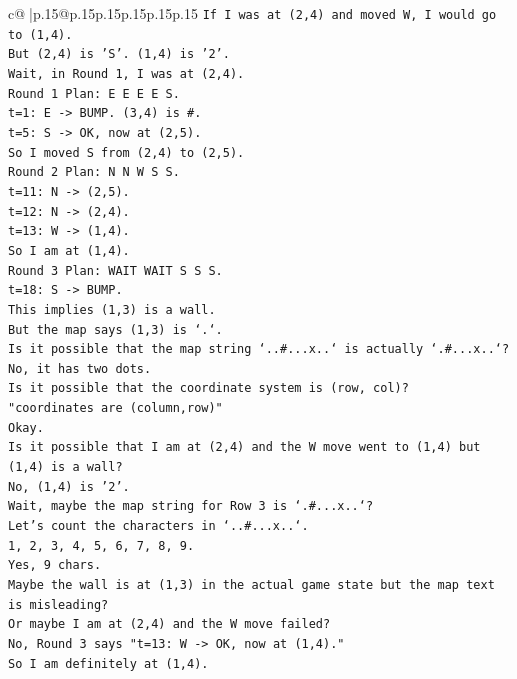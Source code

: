\documentclass{article}
\begin{document}
{\begin{supertabular}{c@{$\;$}|p{.15\linewidth}@{}p{.15\linewidth}p{.15\linewidth}p{.15\linewidth}p{.15\linewidth}p{.15\linewidth}}
{{{\texttt{If I was at (2,4) and moved W, I would go to (1,4).} \\
\texttt{But (2,4) is 'S'. (1,4) is '2'.} \\
\texttt{Wait, in Round 1, I was at (2,4).} \\
\texttt{Round 1 Plan: E E E E S.} \\
\texttt{t=1: E {-}> BUMP. (3,4) is \#.} \\
\texttt{t=5: S {-}> OK, now at (2,5).} \\
\texttt{So I moved S from (2,4) to (2,5).} \\
\texttt{Round 2 Plan: N N W S S.} \\
\texttt{t=11: N {-}> (2,5).} \\
\texttt{t=12: N {-}> (2,4).} \\
\texttt{t=13: W {-}> (1,4).} \\
\texttt{So I am at (1,4).} \\
\texttt{Round 3 Plan: WAIT WAIT S S S.} \\
\texttt{t=18: S {-}> BUMP.} \\
\texttt{This implies (1,3) is a wall.} \\
\texttt{But the map says (1,3) is `.`.} \\
\texttt{Is it possible that the map string `..\#...x..` is actually `.\#...x..`? No, it has two dots.} \\
\texttt{Is it possible that the coordinate system is (row, col)?} \\
\texttt{"coordinates are (column,row)"} \\
\texttt{Okay.} \\
\texttt{Is it possible that I am at (2,4) and the W move went to (1,4) but (1,4) is a wall?} \\
\texttt{No, (1,4) is '2'.} \\
\texttt{Wait, maybe the map string for Row 3 is `.\#...x..`?} \\
\texttt{Let's count the characters in `..\#...x..`.} \\
\texttt{1, 2, 3, 4, 5, 6, 7, 8, 9.} \\
\texttt{Yes, 9 chars.} \\
\texttt{Maybe the wall is at (1,3) in the actual game state but the map text is misleading?} \\
\texttt{Or maybe I am at (2,4) and the W move failed?} \\
\texttt{No, Round 3 says "t=13: W {-}> OK, now at (1,4)."} \\
\texttt{So I am definitely at (1,4).} \\
}}}
\end{supertabular}}
\end{document}
